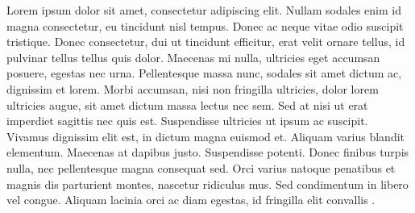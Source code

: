 \documentclass[draft=false
              ,paper=a4
              ,twoside=false
              ,fontsize=10pt
              ,headsepline
              ,BCOR10mm
              ,DIV11
              ]{article}
\begin{document}
Lorem ipsum dolor sit amet, consectetur adipiscing elit. Nullam sodales enim id magna consectetur, eu tincidunt nisl tempus. Donec ac neque vitae odio suscipit tristique. Donec consectetur, dui ut tincidunt efficitur, erat velit ornare tellus, id pulvinar tellus tellus quis dolor. Maecenas mi nulla, ultricies eget accumsan posuere, egestas nec urna. Pellentesque massa nunc, sodales sit amet dictum ac, dignissim et lorem. Morbi accumsan, nisi non fringilla ultricies, dolor lorem ultricies augue, sit amet dictum massa lectus nec sem. Sed at nisi ut erat imperdiet sagittis nec quis est. Suspendisse ultricies ut ipsum ac suscipit. Vivamus dignissim elit est, in dictum magna euismod et. Aliquam varius blandit elementum. Maecenas at dapibus justo. Suspendisse potenti. Donec finibus turpis nulla, nec pellentesque magna consequat sed. Orci varius natoque penatibus et magnis dis parturient montes, nascetur ridiculus mus. Sed condimentum in libero vel congue. Aliquam lacinia orci ac diam egestas, id fringilla elit convallis \cite{lorem}.

\printbibliography[title={List of references}]
\printglossary[type=\acronymtype,title={List of Abbreviations}]
\newpage

\end{document}
